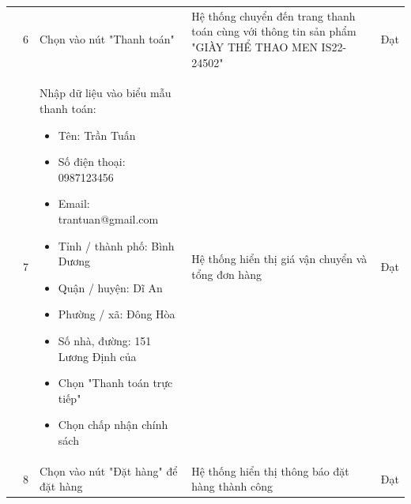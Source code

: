 {\begin{longtable}{| p{2.5cm}| p{1cm}| p{5.5cm}| p{4.5cm} | p{1.5cm} |}
        \cline{2-5}
                                                                                                        & 6                  &
        Chọn vào nút "Thanh toán"                                                                       &
        Hệ thống chuyển đến trang thanh toán cùng với thông tin sản phẩm "GIÀY THỂ THAO MEN IS22-24502" &
        Đạt                                                                                                                                                                                            \\
        \cline{2-5}
                                                                                                        & 7                  &
        Nhập dữ liệu vào biểu mẫu thanh toán:
        \begin{itemize}
            \item Tên: Trần Tuấn
            \item Số điện thoại: 0987123456
            \item Email: trantuan@gmail.com
            \item Tỉnh / thành phố: Bình Dương
            \item Quận / huyện: Dĩ An
            \item Phường / xã: Đông Hòa
            \item Số nhà, đường: 151 Lương Định của
            \item Chọn "Thanh toán trực tiếp"
            \item Chọn chấp nhận chính sách
        \end{itemize}
                                                                                                        &
        Hệ thống hiển thị giá vận chuyển và tổng đơn hàng                                               &
        Đạt                                                                                                                                                                                            \\
        \cline{2-5}
                                                                                                        & 8                  &
        Chọn vào nút "Đặt hàng" để đặt hàng                                                             &
        Hệ thống hiển thị thông báo đặt hàng thành công                                                 &
        Đạt                                                                                                                                                                                            \\

\end{longtable}}
